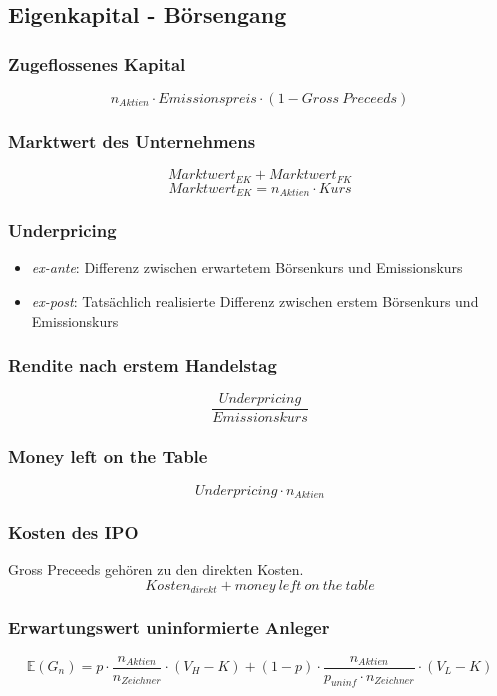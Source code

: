 \subsection{Eigenkapital - Börsengang}

\subsubsection{Zugeflossenes Kapital}
\[n_{Aktien} \cdot Emissionspreis \cdot (1- Gross~Preceeds)\]

\subsubsection{Marktwert des Unternehmens}
\[Marktwert_{EK} + Marktwert_{FK}\]
\[Marktwert_{EK} = n_{Aktien} \cdot Kurs\]

\subsubsection{Underpricing}
\begin{itemize}
	\item \textit{ex-ante}: Differenz zwischen erwartetem Börsenkurs und Emissionskurs
	\item \textit{ex-post}: Tatsächlich realisierte Differenz zwischen erstem Börsenkurs und Emissionskurs
\end{itemize}

\subsubsection{Rendite nach erstem Handelstag}
\[\frac{Underpricing}{Emissionskurs}\]

\subsubsection{Money left on the Table}
\[Underpricing \cdot n_{Aktien}\]

\subsubsection{Kosten des IPO}
Gross Preceeds gehören zu den direkten Kosten.
\[Kosten_{direkt} + money~left~on~the~table\]

\subsubsection{Erwartungswert uninformierte Anleger}
\[\mathbb{E}(G_n) = p \cdot \frac{n_{Aktien}}{n_{Zeichner}} \cdot (V_H - K) + (1-p) \cdot \frac{n_{Aktien}}{p_{uninf} \cdot n_{Zeichner}} \cdot (V_L-K)\]

